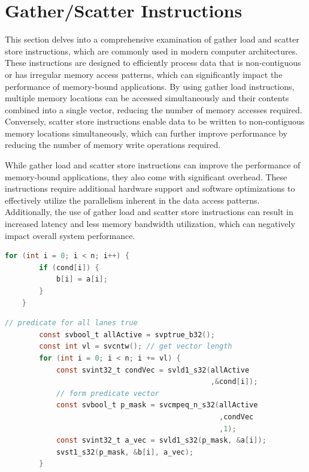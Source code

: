 \documentclass[\main/thesis.tex]{subfiles}
\begin{document}
\section{Gather/Scatter Instructions}

This section delves into a comprehensive examination of gather load and scatter store instructions, which are commonly used in modern computer architectures. These instructions are designed to efficiently process data that is non-contiguous or has irregular memory access patterns, which can significantly impact the performance of memory-bound applications. By using gather load instructions, multiple memory locations can be accessed simultaneously and their contents combined into a single vector, reducing the number of memory accesses required. Conversely, scatter store instructions enable data to be written to non-contiguous memory locations simultaneously, which can further improve performance by reducing the number of memory write operations required.

While gather load and scatter store instructions can improve the performance of memory-bound applications, they also come with significant overhead. These instructions require additional hardware support and software optimizations to effectively utilize the parallelism inherent in the data access patterns. Additionally, the use of gather load and scatter store instructions can result in increased latency and less memory bandwidth utilization, which can negatively impact overall system performance.

\newpage

\begin{lstlisting}[language=C, caption=Scalar Code]
    for (int i = 0; i < n; i++) {
        if (cond[i]) {
            b[i] = a[i];
        }
    }
    \end{lstlisting}
    
    \begin{lstlisting}[language=C,caption=Vectorized Code]
        // predicate for all lanes true
        const svbool_t allActive = svptrue_b32(); 
        const int vl = svcntw(); // get vector length
        for (int i = 0; i < n; i += vl) {
            const svint32_t condVec = svld1_s32(allActive
                                                ,&cond[i]);
            // form predicate vector
            const svbool_t p_mask = svcmpeq_n_s32(allActive 
                                                  ,condVec
                                                  ,1); 
            const svint32_t a_vec = svld1_s32(p_mask, &a[i]);
            svst1_s32(p_mask, &b[i], a_vec); 
        }
    \end{lstlisting}
    
\end{document}
